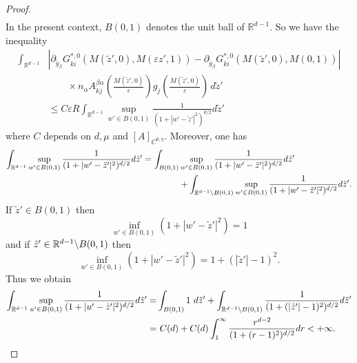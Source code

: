 \documentclass[11pt, reqno]{amsart}
\theoremstyle{definition}
\theoremstyle{remark}
\numberwithin{equation}{section}
\newcommand{\bs}{\symbol{92}}
\begin{document}
\begin{proof}[Proof]
\begin{align*}
		\end{align*}
		In the present context, $B(0,1)$ denotes the unit ball of $\mathbb{R}^{d-1}$.
		So we have the inequality
		\begin{align*}
			\int_{{\mathbb{R}}^{d-1}}&	\left| \partial_{\tilde{y}_\beta} G^{*,0}_{ki} \left(M(\tilde{z}',0),M (\varepsilon z',1) \right)
			-\partial_{\tilde{y}_\beta} G^{*,0}_{ki}(M(\tilde{z}',0),M (0,1) )  \right| \\
			&\qquad \times n_\alpha A^{\beta\alpha}_{kj} \left(\frac{M(\tilde{z}',0)}{\varepsilon }\right) g_j\left(\frac{M(\tilde{z}',0)}{\varepsilon }\right)  \,d\tilde{z}' \\
			&	\leq C\varepsilon R \int_{{\mathbb{R}}^{d-1}}\sup_{w'\in B(0,1)}\frac{1}{(1+|w'-\tilde{z}'|^2)^{d/2}}d\tilde{z}'
		\end{align*} where $C$ depends on $d,\mu$ and $[A]_{C^{0,\eta}}$.
	Moreover, one has 
		\begin{align*}
			\int_{{\mathbb{R}}^{d-1}} \sup_{w'\in B(0,1)}\frac{1}{(1+|w'-\tilde{z}'|^2)^{d/2}}  d\tilde{z}'= \int_{B(0,1)}& \sup_{w'\in B(0,1)}\frac{ 1}{(1+|w'-\tilde{z}'|^2)^{d/2}} d\tilde{z}'\\
			& + \int_{{\mathbb{R}}^{d-1}\bs B(0,1) } \sup_{w'\in B(0,1)}\frac{1}{(1+|w'-\tilde{z}'|^2)^{d/2}} d\tilde{z}'.
		\end{align*}
		If $ \tilde{z}'\in B(0,1)$ then $$\inf_{w'\in B(0,1)}  (1+|w'-\tilde{z}'|^2)=1$$ and if  $ \tilde{z}'\in{\mathbb{R}}^{d-1}\bs B(0,1)$ then $$\inf_{w'\in B(0,1)}  (1+|w'-\tilde{z}'|^2)=1+(|\tilde{z}'|- 1)^2.$$
		Thus  we obtain
		\begin{align*}
			\int_{{\mathbb{R}}^{d-1}} \sup_{u'\in B(0,1)}\frac{1}{(1+|u'-\tilde{z}'|^2)^{d/2}}  d\tilde{z}'=& \int_{B(0,1)}1\ d\tilde{z}' + \int_{{\mathbb{R}}^{d-1}\bs B(0,1) } \frac{1}{(1+(|\tilde{z}'|-1)^2)^{d/2}} d\tilde{z}'\\
			=& \ C(d) + C(d)\int_1^\infty \frac{r^{d-2}}{(1+(r-1)^2)^{d/2}} dr < +\infty.
		\end{align*}
		

\end{proof}
\end{document}
